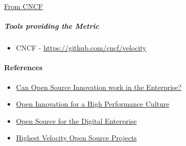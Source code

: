 \href{https://www.cncf.io/blog/2017/06/05/30-highest-velocity-open-source-projects/}{From
CNCF}

\hypertarget{tools-providing-the-metric}{%
\subparagraph{Tools providing the
Metric}\label{tools-providing-the-metric}}

\begin{itemize}
\tightlist
\item
  CNCF -
  \href{https://github.com/cncf/velocity}{https://github.com/cncf/velocity}
\end{itemize}

\hypertarget{references}{%
\paragraph{References}\label{references}}

\begin{itemize}
\tightlist
\item
  \href{https://www.threefivetwo.com/blog/can-open-source-innovation-work-in-the-enterprise}{Can
  Open Source Innovation work in the Enterprise?}
\item
  \href{https://www.nearform.com/blog/want-a-high-performing-culture-make-way-for-open-innovation}{Open
  Innovation for a High Performance Culture}
\item
  \href{https://www.cio.com/article/3213146/open-source-is-powering-the-digital-enterprise.html}{Open
  Source for the Digital Enterprise}
\item
  \href{https://www.cncf.io/blog/2017/06/05/30-highest-velocity-open-source-projects}{Highest
  Velocity Open Source Projects}
\end{itemize}
